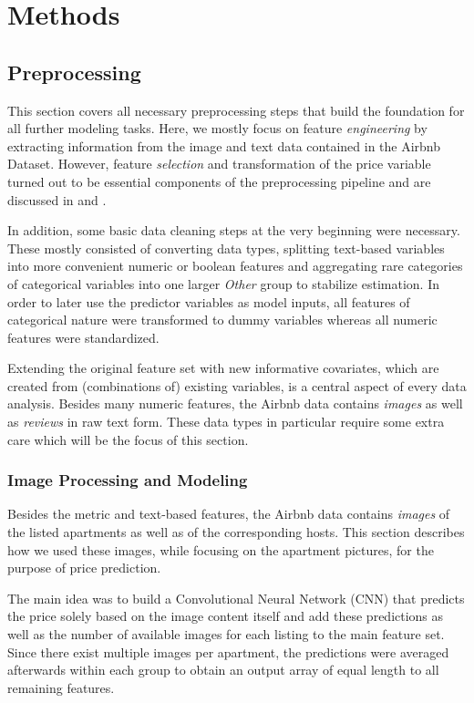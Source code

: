 \section{Methods}

\subsection{Preprocessing}

This section covers all necessary preprocessing steps that build the foundation for all further modeling tasks.
Here, we mostly focus on feature \emph{engineering} by extracting information from the image and text data contained in the Airbnb Dataset.
However, feature \emph{selection} and transformation of the price variable turned out to be essential components of the preprocessing pipeline and are discussed in  and .

In addition, some basic data cleaning steps at the very beginning were necessary.
These mostly consisted of converting data types, splitting text-based variables into more convenient numeric or boolean features and aggregating rare categories of categorical variables into one larger \emph{Other} group to stabilize estimation.
In order to later use the predictor variables as model inputs, all features of categorical nature were transformed to dummy variables whereas all numeric features were standardized.

Extending the original feature set with new informative covariates, which are created from (combinations of) existing variables, is a central aspect of every data analysis.
Besides many numeric features, the Airbnb data contains \emph{images} as well as \emph{reviews} in raw text form.
These data types in particular require some extra care which will be the focus of this section.

\subsubsection{Image Processing and Modeling}

Besides the metric and text-based features, the Airbnb data contains \emph{images} of the listed apartments as well as of the corresponding hosts.
This section describes how we used these images, while focusing on the apartment pictures, for the purpose of price prediction.

The main idea was to build a Convolutional Neural Network (CNN) that predicts the price solely based on the image content itself and add these predictions as well as the number of available images for each listing to the main feature set.
Since there exist multiple images per apartment, the predictions were averaged afterwards within each group to obtain an output array of equal length to all remaining features.

